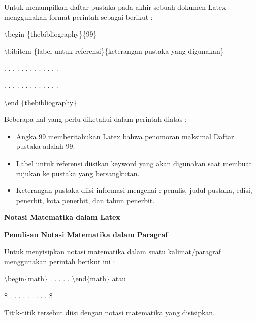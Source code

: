Untuk menampilkan daftar pustaka pada akhir sebuah dokumen Latex menggunakan format perintah sebagai berikut :\par \vspace{12pt}

$\setminus$begin \{thebibliography\}\{99\}
\par \vspace{12pt}
$\setminus$bibitem \{label untuk referensi\}\{keterangan pustaka yang digunakan\}
\par \vspace{12pt}
. . . . . . . . . . . . .

. . . . . . . . . . . . .
\par \vspace{12pt}
$\setminus$end \{thebibliography\}
\par \vspace{12pt}


Beberapa hal yang perlu diketahui dalam perintah diatas :

\begin{itemize}
\item Angka 99 memberitahukan Latex bahwa penomoran maksimal Daftar pustaka adalah 99.
\item Label untuk referensi diisikan keyword yang akan digunakan saat membuat rujukan ke pustaka yang bersangkutan.
\item Keterangan pustaka diisi informasi mengenai : penulis, judul pustaka, edisi, penerbit, kota penerbit, dan tahun penerbit.
\end{itemize}


\textbf{Notasi Matematika dalam Latex}\par \vspace{12pt}

\textbf{Penulisan Notasi Matematika dalam Paragraf}\par \vspace{12pt}

Untuk menyisipkan notasi matematika dalam suatu kalimat/paragraf menggunakan perintah berikut ini :
\par \vspace{12pt}
$\setminus$begin\{math\} . . . . . $\setminus$end\{math\} atau
\par \vspace{12pt}
\$ . . . . . . . . . \$
\par \vspace{12pt}


Titik-titik tersebut diisi dengan notasi matematika yang disisipkan.\par \vspace{12pt}

